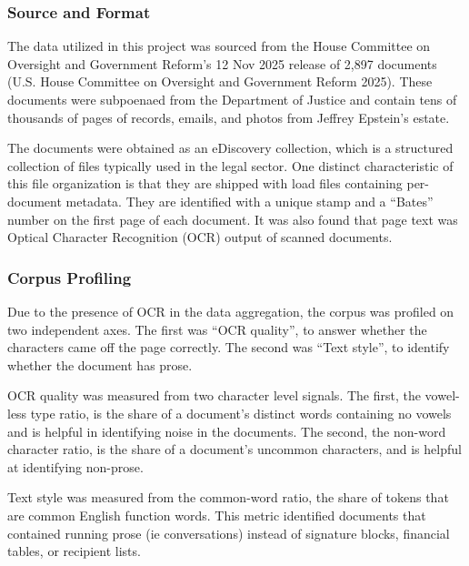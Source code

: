 \documentclass[
  letterpaper,
  DIV=11,
  numbers=noendperiod]{scrartcl}
\begin{document}
\subsubsection{Source and Format}\label{source-and-format}

The data utilized in this project was sourced from the House Committee
on Oversight and Government Reform's 12 Nov 2025 release of 2,897
documents (U.S. House Committee on Oversight and Government Reform
2025). These documents were subpoenaed from the Department of Justice
and contain tens of thousands of pages of records, emails, and photos
from Jeffrey Epstein's estate.

The documents were obtained as an eDiscovery collection, which is a
structured collection of files typically used in the legal sector. One
distinct characteristic of this file organization is that they are
shipped with load files containing per-document metadata. They are
identified with a unique stamp and a ``Bates'' number on the first page
of each document. It was also found that page text was Optical Character
Recognition (OCR) output of scanned documents.

\subsubsection{Corpus Profiling}\label{corpus-profiling}

Due to the presence of OCR in the data aggregation, the corpus was
profiled on two independent axes. The first was ``OCR quality'', to
answer whether the characters came off the page correctly. The second
was ``Text style'', to identify whether the document has prose.

OCR quality was measured from two character level signals. The first,
the vowel-less type ratio, is the share of a document's distinct words
containing no vowels and is helpful in identifying noise in the
documents. The second, the non-word character ratio, is the share of a
document's uncommon characters, and is helpful at identifying non-prose.

Text style was measured from the common-word ratio, the share of tokens
that are common English function words. This metric identified documents
that contained running prose (ie conversations) instead of signature
blocks, financial tables, or recipient lists.
\end{document}
